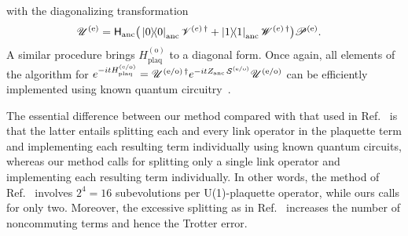 \documentclass[aps,prd,twocolumn,showpacs,groupedaddress,superscriptaddress,nofootinbib,floatfix,preprintnumbers,longbibliography]{revtex4-1}
\begin{document}
%
with the diagonalizing transformation
%
\begin{align}
    &\mathscr{U}^{(\text{e})} = \mathsf{H}_{\rm anc} 
    \big(\ket{0}\!\!\bra{0}_{\rm anc} \mathscr{V}^{{(e)}\,\dagger} + \ket{1}\!\!\bra{1}_{\rm anc} \mathscr{W}^{{(e)}\,\dagger}\big)\mathscr{P}^{(\text{e})}.
\end{align}
%
A similar procedure brings $H_{\mathrm{plaq}}^{(\text{o})}$ to a diagonal form. Once again, all elements of the algorithm for $e^{-itH_{\mathrm{plaq}}^{(\text{e/o})}}=\mathscr{U}^{(\text{e/o})\,\dagger}
    e^{-itZ_{\rm anc} \, \mathcal{S}^{(\text{e/o})}}    \mathscr{U}^{(\text{e/o})}$ can be efficiently implemented using known quantum circuitry~\cite{Davoudi:2022xmb}.

The essential difference between our method compared with that used in Ref.~\cite{Kan:2021xfc} is that the latter entails splitting each and every link operator in the plaquette term and implementing each resulting term individually using known quantum circuits, whereas our method calls for splitting only a single link operator and implementing each resulting term individually. In other words, the method of Ref.~\cite{Kan:2021xfc} involves $2^4=16$ subevolutions per U(1)-plaquette operator, while ours calls for only two. Moreover, the excessive splitting as in Ref.~\cite{Kan:2021xfc} increases the number of noncommuting terms and hence the Trotter error.
\end{document}
